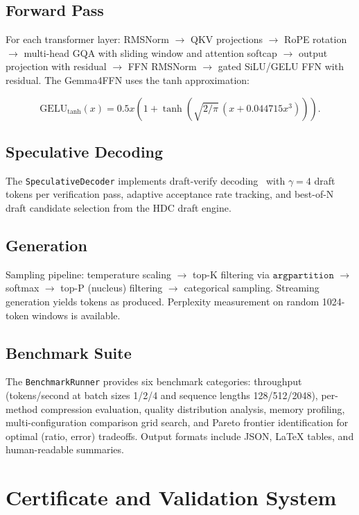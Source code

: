 \documentclass[11pt,a4paper,twocolumn]{article}
\begin{document}
\subsection{Forward Pass}
For each transformer layer: RMSNorm $\to$ QKV projections $\to$ RoPE rotation $\to$ multi-head GQA with sliding window and attention softcap $\to$ output projection with residual $\to$ FFN RMSNorm $\to$ gated SiLU/GELU FFN with residual. The Gemma4FFN uses the tanh approximation:

\begin{equation}
	\label{eq:gelu_tanh}
	\text{GELU}_\text{tanh}(x) = 0.5x\left(1 + \tanh\left(\sqrt{2/\pi}\,(x + 0.044715 x^3)\right)\right).
\end{equation}

\subsection{Speculative Decoding}
The \texttt{SpeculativeDecoder} implements draft-verify decoding~\cite{leviathan2023speculative} with $\gamma=4$ draft tokens per verification pass, adaptive acceptance rate tracking, and best-of-N draft candidate selection from the HDC draft engine.

\subsection{Generation}
Sampling pipeline: temperature scaling $\to$ top-K filtering via $\texttt{argpartition}$ $\to$ softmax $\to$ top-P (nucleus) filtering $\to$ categorical sampling. Streaming generation yields tokens as produced. Perplexity measurement on random 1024-token windows is available.

\subsection{Benchmark Suite}
The \texttt{BenchmarkRunner} provides six benchmark categories: throughput (tokens/second at batch sizes 1/2/4 and sequence lengths 128/512/2048), per-method compression evaluation, quality distribution analysis, memory profiling, multi-configuration comparison grid search, and Pareto frontier identification for optimal (ratio, error) tradeoffs. Output formats include JSON, LaTeX tables, and human-readable summaries.

\section{Certificate and Validation System}
\label{sec:certificates}
\end{document}
